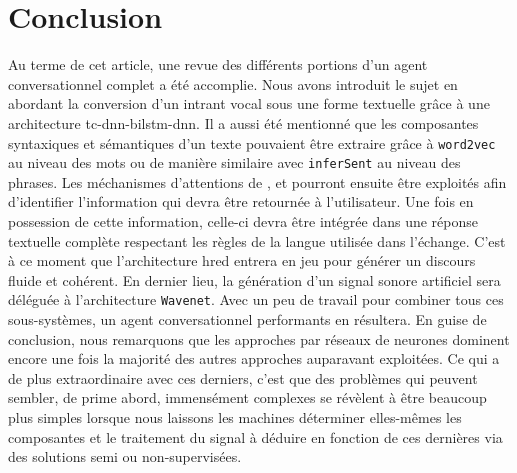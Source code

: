 \section*{Conclusion}
Au terme de cet article, une revue des différents portions d'un agent conversationnel complet a été accomplie. Nous avons introduit le sujet en abordant la conversion d'un intrant vocal sous une forme textuelle grâce à une architecture \gls{tc}-\gls{dnn}-\gls{bilstm}-\gls{dnn}. Il a aussi été mentionné que les composantes syntaxiques et sémantiques d'un texte pouvaient être extraire grâce à \texttt{word2vec} au niveau des mots ou de manière similaire avec \texttt{inferSent} au niveau des phrases. Les méchanismes d'attentions de \cite{attentionBasedApproaches}, \cite{attentionIsAllYouNeed} et \cite{attentionMechanism} pourront ensuite être exploités afin d’identifier l'information qui devra être retournée à l'utilisateur. Une fois en possession de cette information, celle-ci devra être intégrée dans une réponse textuelle complète respectant les règles de la langue utilisée dans l'échange. C'est à ce moment que l'architecture \gls{hred} entrera en jeu pour générer un discours fluide et cohérent. En dernier lieu, la génération d'un signal sonore artificiel sera déléguée à l'architecture \texttt{Wavenet}. Avec un peu de travail pour combiner tous ces sous-systèmes, un agent conversationnel performants en résultera. En guise de conclusion, nous remarquons que les approches par réseaux de neurones dominent encore une fois la majorité des autres approches auparavant exploitées. Ce qui a de plus extraordinaire avec ces derniers, c'est que des problèmes qui peuvent sembler, de prime abord, immensément complexes se révèlent à être beaucoup plus simples lorsque nous laissons les machines déterminer elles-mêmes les composantes et le traitement du signal à déduire en fonction de ces dernières via des solutions semi ou non-supervisées.
